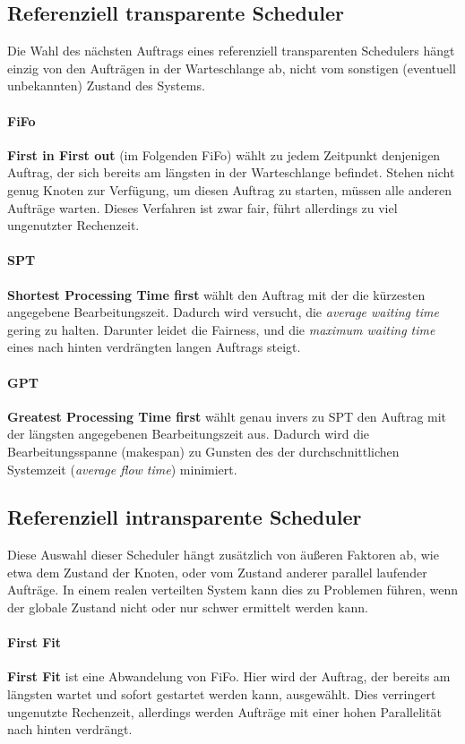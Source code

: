 \subsection{Referenziell transparente Scheduler}
Die Wahl des nächsten Auftrags eines referenziell transparenten Schedulers hängt einzig von den Aufträgen in der Warteschlange ab, nicht vom sonstigen (eventuell unbekannten) Zustand des Systems.

\paragraph{FiFo}
\textbf{First in First out} (im Folgenden FiFo) wählt zu jedem Zeitpunkt denjenigen Auftrag, der sich bereits am längsten in der Warteschlange befindet. Stehen nicht genug Knoten zur Verfügung, um diesen Auftrag zu starten, müssen alle anderen Aufträge warten. Dieses Verfahren ist zwar fair, führt allerdings zu viel ungenutzter Rechenzeit.

\paragraph{SPT}
\textbf{Shortest Processing Time first} wählt den Auftrag mit der die kürzesten angegebene Bearbeitungszeit. Dadurch wird versucht, die \emph{average waiting time} gering zu halten. Darunter leidet die Fairness, und die \emph{maximum waiting time} eines nach hinten verdrängten langen Auftrags steigt.

\paragraph{GPT}
\textbf{Greatest Processing Time first} wählt genau invers zu SPT den Auftrag mit der längsten angegebenen Bearbeitungszeit aus. Dadurch wird die Bearbeitungsspanne (makespan) zu Gunsten des der durchschnittlichen Systemzeit (\emph{average flow time}) minimiert.

\subsection{Referenziell intransparente Scheduler}
Diese Auswahl dieser Scheduler hängt zusätzlich von äußeren Faktoren ab, wie etwa dem Zustand der Knoten, oder vom Zustand anderer parallel laufender Aufträge. In einem realen verteilten System kann dies zu Problemen führen, wenn der globale Zustand nicht oder nur schwer ermittelt werden kann.

\paragraph{First Fit}
\textbf{First Fit} ist eine Abwandelung von FiFo. Hier wird  der Auftrag, der bereits am längsten wartet und sofort gestartet werden kann, ausgewählt. Dies verringert ungenutzte Rechenzeit, allerdings werden Aufträge mit einer hohen Parallelität nach hinten verdrängt.

